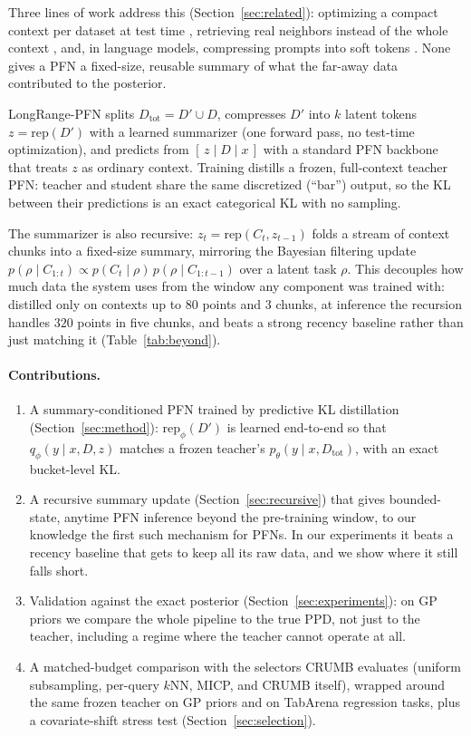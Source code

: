 \documentclass[11pt]{article}
\newcommand{\Dtot}{D_{\mathrm{tot}}}
\newcommand{\Dfar}{D'}
\newcommand{\Dloc}{D}
\newcommand{\rep}{\mathrm{rep}}
\begin{document}
Three lines of work address this (Section~\ref{sec:related}): optimizing a
compact context per dataset at test time
\citep{feuer2024tunetables, ma2024icd}, retrieving real neighbors instead of
the whole context \citep{thomas2024localpfn}, and, in language models,
compressing prompts into soft tokens
\citep{mu2023gisting, ge2023icae, chevalier2023autocompressors}. None gives
a PFN a fixed-size, reusable summary of what the far-away data contributed
to the posterior.

LongRange-PFN splits $\Dtot = \Dfar \cup \Dloc$,
compresses $\Dfar$ into $k$ latent tokens $z = \rep(\Dfar)$ with a learned
summarizer (one forward pass, no test-time optimization), and predicts from
$[\,z \mid \Dloc \mid x\,]$ with a standard PFN backbone that treats $z$ as
ordinary context. Training distills a frozen, full-context teacher PFN:
teacher and student share the same discretized (``bar'') output, so the KL
between their predictions is an exact categorical KL with no sampling.

The summarizer is also recursive: $z_t = \rep(C_t, z_{t-1})$ folds a stream
of context chunks into a fixed-size summary, mirroring the Bayesian
filtering update $p(\rho \mid C_{1:t}) \propto p(C_t \mid \rho)\,
p(\rho \mid C_{1:t-1})$ over a latent task $\rho$. This decouples how much
data the system uses from the window any component was trained with:
distilled only on contexts up to $80$ points and $3$ chunks, at inference
the recursion handles $320$ points in five chunks, and beats a strong
recency baseline rather than just matching it (Table~\ref{tab:beyond}).

\paragraph{Contributions.}
\begin{enumerate}
  \item A summary-conditioned PFN trained by predictive KL distillation
  (Section~\ref{sec:method}): $\rep_\phi(\Dfar)$ is learned end-to-end so
  that $q_\phi(y \mid x, \Dloc, z)$ matches a frozen teacher's
  $p_\theta(y \mid x, \Dtot)$, with an exact bucket-level KL.
  \item A recursive summary update (Section~\ref{sec:recursive}) that gives
  bounded-state, anytime PFN inference beyond the pre-training window,
  to our knowledge the first such mechanism for PFNs. In our experiments it
  beats a recency baseline that gets to keep all its raw data, and we show
  where it still falls short.
  \item Validation against the exact posterior (Section~\ref{sec:experiments}):
  on GP priors we compare the whole pipeline to the true PPD, not just to
  the teacher, including a regime where the teacher cannot operate at all.
  \item A matched-budget comparison with the selectors CRUMB evaluates
  (uniform subsampling, per-query $k$NN, MICP, and CRUMB itself), wrapped
  around the same frozen teacher on GP priors and on TabArena regression
  tasks, plus a covariate-shift stress test (Section~\ref{sec:selection}).
\end{enumerate}
\end{document}
